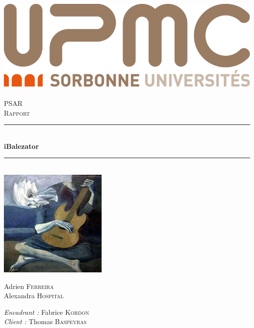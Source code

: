 \documentclass{scrreprt}
\newcommand{\HRule}{\rule{\linewidth}{0.5mm}}
\begin{document}
\begin{titlepage}
  \begin{sffamily}
  \begin{center}

    \includegraphics[scale=0.2]{images/logo_upmc.png}~\\[1.5cm]

    \textsc{\LARGE PSAR}\\[2cm]

    \textsc{\Large Rapport}\\[1.5cm]

    \HRule \\[0.4cm]
    { \huge \bfseries iBalezator\\[0.4cm] }

    \HRule \\[2cm]
    \includegraphics[scale=0.4]{images/picasso_le_vieux_balese.jpg}
    \\[2cm]


    \begin{minipage}{0.4\textwidth}
      \begin{flushleft} \large
        Adrien \textsc{Ferreira}\\
        Alexandra \textsc{Hospital}\\
      \end{flushleft}
    \end{minipage}
    \begin{minipage}{0.4\textwidth}
      \begin{flushright} \large
        \emph{Encadrant :} Fabrice \textsc{Kordon}\\
        \emph{Client : } Thomas \textsc{Baspeyras}
      \end{flushright}
    \end{minipage}


\end{center}
\end{sffamily}
\end{titlepage}
\end{document}
